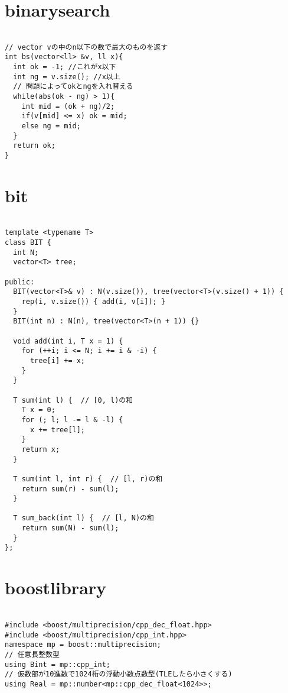 \documentclass[a4j,titlepage]{jarticle} %
\begin{document}
\color{white}
\section{binarysearch}
\color{black}
\begin{lstlisting}[caption=binarysearch]

// vector vの中のn以下の数で最大のものを返す
int bs(vector<ll> &v, ll x){
  int ok = -1; //これがx以下 
  int ng = v.size(); //x以上 
  // 問題によってokとngを入れ替える
  while(abs(ok - ng) > 1){
    int mid = (ok + ng)/2;
    if(v[mid] <= x) ok = mid;
    else ng = mid;
  }
  return ok;
}

\end{lstlisting}

\color{white}
\section{bit}
\color{black}
\begin{lstlisting}[caption=bit]

template <typename T>
class BIT {
  int N;
  vector<T> tree;

public:
  BIT(vector<T>& v) : N(v.size()), tree(vector<T>(v.size() + 1)) {
    rep(i, v.size()) { add(i, v[i]); }
  }
  BIT(int n) : N(n), tree(vector<T>(n + 1)) {}

  void add(int i, T x = 1) {
    for (++i; i <= N; i += i & -i) {
      tree[i] += x;
    }
  }

  T sum(int l) {  // [0, l)の和
    T x = 0;
    for (; l; l -= l & -l) {
      x += tree[l];
    }
    return x;
  }

  T sum(int l, int r) {  // [l, r)の和
    return sum(r) - sum(l);
  }

  T sum_back(int l) {  // [l, N)の和
    return sum(N) - sum(l);
  }
};

\end{lstlisting}

\color{white}
\section{boostlibrary}
\color{black}
\begin{lstlisting}[caption=boostlibrary]

#include <boost/multiprecision/cpp_dec_float.hpp>
#include <boost/multiprecision/cpp_int.hpp>
namespace mp = boost::multiprecision;
// 任意長整数型
using Bint = mp::cpp_int;
// 仮数部が10進数で1024桁の浮動小数点数型(TLEしたら小さくする)
using Real = mp::number<mp::cpp_dec_float<1024>>;

\end{lstlisting}
\end{document}
